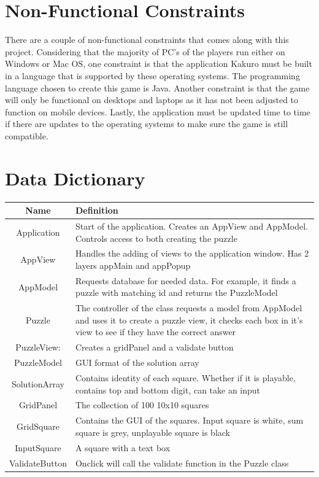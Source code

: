 \documentclass[12pt]{article}
\begin{document}
\clearpage

\section{Non-Functional Constraints}
There are a couple of non-functional constraints that comes along with this project. Considering that the majority of PC’s of the players run either on Windows or Mac OS, one constraint is that the application Kakuro must be built in a language that is supported by these operating systems. The programming language chosen to create this game is Java. Another constraint is that the game will only be functional on desktops and laptops as it has not been adjusted to function on mobile devices. Lastly, the application must be updated time to time if there are updates to the operating systems to make sure the game is still compatible.\\

\clearpage

\section{Data Dictionary}

\begin{table}[htbp]
\begin{tabular}{|c | m{10cm}|}
\hline
\cellcolor{gray}Name & \cellcolor{gray}Definition \\
\hline
Application & Start of the application. Creates an AppView and AppModel. Controls access to both creating the puzzle  \\
\hline
AppView & Handles the adding of views to the application window. Has 2 layers appMain and appPopup \\
\hline
AppModel & Requests database for needed data. For example, it finds a puzzle with matching id and returns the PuzzleModel \\
\hline
Puzzle & The controller of the class requests a model from AppModel and uses it to create a puzzle view, it checks each box in it's view to see if they have the correct answer \\
\hline
PuzzleView: & Creates a gridPanel and a validate button\\
\hline
PuzzleModel & GUI format of the solution array\\
\hline
SolutionArray & Contains identity of each square. Whether if it is playable, contains top and bottom digit, can take an input\\
\hline
GridPanel & The collection of 100 10x10 squares \\
\hline
GridSquare & Contains the GUI of the squares. Input square is white, sum square is grey, unplayable square is black\\
\hline
InputSquare & A square with a text box
 \\
\hline
ValidateButton & Onclick will call the validate function in the Puzzle class \\
\hline
\end{tabular}

\end{table}
\end{document}
